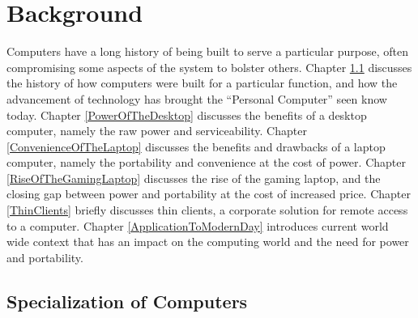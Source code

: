 \chapter{Background} %

\label{Chapter2} %

Computers have a long history of being built to serve a particular purpose, often compromising some aspects of the system to bolster others.
Chapter \ref{SpecializationOfComputers} discusses the history of how computers were built for a particular function, and how the advancement of technology has brought the \enquote{Personal Computer} seen know today.
Chapter \ref{PowerOfTheDesktop} discusses the benefits of a desktop computer, namely the raw power and serviceability.
Chapter \ref{ConvenienceOfTheLaptop} discusses the benefits and drawbacks of a laptop computer, namely the portability and convenience at the cost of power.
Chapter \ref{RiseOfTheGamingLaptop} discusses the rise of the gaming laptop, and the closing gap between power and portability at the cost of increased price.
Chapter \ref{ThinClients} briefly discusses thin clients, a corporate solution for remote access to a computer.
Chapter \ref{ApplicationToModernDay} introduces current world wide context that has an impact on the computing world and the need for power and portability.

\section{Specialization of Computers}\label{SpecializationOfComputers}

